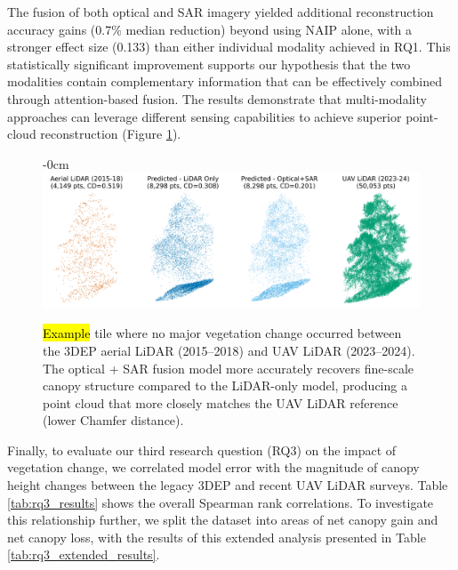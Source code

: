 \documentclass[remotesensing,article,accept,pdftex,moreauthors]{Definitions/mdpi}
\begin{document}
The fusion of both optical and SAR imagery yielded additional reconstruction accuracy gains (0.7\% median reduction) beyond using NAIP alone, with a stronger effect size (0.133) than either individual modality achieved in RQ1. This statistically significant improvement supports our hypothesis that the two modalities contain complementary information that can be effectively combined through attention-based fusion. The results demonstrate that multi-modality approaches can leverage different sensing capabilities to achieve superior point-cloud reconstruction (Figure \ref{fig:model_output_example}).


\vspace{-3pt}


\begin{figure}[H]
\begin{adjustwidth}{-\extralength}{0cm}
\centering
    \includegraphics[width=0.9\linewidth]{figures/model_output_example.png}
    \end{adjustwidth}
    \caption{\hl{Example} %
 tile where no major vegetation change occurred between the 3DEP aerial LiDAR (2015--2018) and UAV LiDAR (2023--2024). The optical + SAR fusion model more accurately recovers fine-scale canopy structure compared to the LiDAR-only model, producing a point cloud that more closely matches the UAV LiDAR reference (lower Chamfer distance).}
    \label{fig:model_output_example}
\end{figure}




Finally, to evaluate our third research question (RQ3) on the impact of vegetation change, we correlated model error with the magnitude of canopy height changes between the legacy 3DEP and recent UAV LiDAR surveys. Table \ref{tab:rq3_results} shows the overall Spearman rank correlations. To investigate this relationship further, we split the dataset into areas of net canopy gain and net canopy loss, with the results of this extended analysis presented in Table \ref{tab:rq3_extended_results}.
\end{document}
